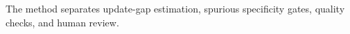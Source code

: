 The method separates update-gap estimation, spurious specificity gates, quality checks, and human review.
